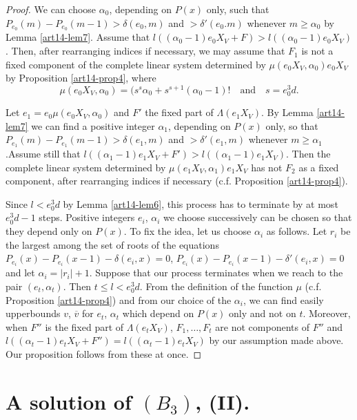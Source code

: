 \begin{proof}
We can choose $\alpha_{0}$, depending on $P(x)$ only, such that $P_{e_{0}}(m)-P_{e_{0}}(m-1)>\delta (e_{0},m)$ and $>\delta'(e_{0}.m)$ whenever $m\geq \alpha_{0}$ by Lemma \ref{art14-lem7}. Assume that $l((\alpha_{0}-1)e_{0}X_{V}+F)>l((\alpha_{0}-1)e_{0}X_{V})$. Then, after rearranging indices if necessary, we may assume that $F_{1}$ is not a fixed component of the complete linear system determined by $\mu(e_{0}X_{V},\alpha_{0})e_{0}X_{V}$ by Proposition \ref{art14-prop4}, where
$$
\mu (e_{0}X_{V}, \alpha_{0})=(s^{s}\alpha_{0}+s^{s+1}(\alpha_{0}-1)!\text{~~ and~~ } s=e^{3}_{0}d.
$$

Let $e_{1}=e_{0}\mu(e_{0}X_{V},\alpha_{0})$ and $F'$ the fixed part of $\Lambda (e_{1}X_{V})$. By Lemma \ref{art14-lem7} we can find a positive integer $\alpha_{1}$, depending on $P(x)$ only, so that $P_{e_{1}}(m)-P_{e_{1}}(m-1)>\delta (e_{1},m)$ and $>\delta'(e_{1},m)$ whenever $m\geq \alpha_{1}$.\pageoriginale Assume still that $l((\alpha_{1}-1)e_{1}X_{V}+F')>l((\alpha_{1}-1)e_{1}X_{V})$. Then the complete linear system determined by $\mu(e_{1}X_{V},\alpha_{1})e_{1}X_{V}$ has not $F_{2}$ as a fixed component, after rearranging indices if necessary (c.f. Proposition \ref{art14-prop4}).

Since $l<e^{3}_{0}d$ by Lemma \ref{art14-lem6}, this process has to terminate by at most $e^{3}_{0}d-1$ steps. Positive integers $e_{i}$, $\alpha_{i}$ we choose successively can be chosen so that they depend only on $P(x)$. To fix the idea, let us choose $\alpha_{i}$ as follows. Let $r_{i}$ be the largest among the set of roots of the equations $P_{e_{i}}(x)-P_{e_{i}}(x-1)-\delta (e_{i},x)=0$, $P_{e_{i}}(x)-P_{e_{i}}(x-1)-\delta'(e_{i},x)=0$ and let $\alpha_{i}=|r_{i}|+1$. Suppose that our process terminates when we reach to the pair $(e_{t},\alpha_{t})$. Then $t\leq l<e^{3}_{0}d$. From the definition of the function $\mu$ (c.f. Proposition \ref{art14-prop4}) and from our choice of the $\alpha_{i}$, we can find easily upperbounds $v$, $\overline{v}$ for $e_{t}$, $\alpha_{t}$ which depend on $P(x)$ only and not on $t$. Moreover, when $F''$ is the fixed part of $\Lambda(e_{t}X_{V})$, $F_{1},\ldots,F_{t}$ are not components of $F''$ and $l((\alpha_{t}-1)e_{t}X_{V}+F'')=l((\alpha_{t}-1)e_{t}X_{V})$ by our assumption made above. Our proposition follows from these at once.
\end{proof}

\section{A solution of \texorpdfstring{$(B_{3})$}{B3}, (II).}\label{art14-sec6}


